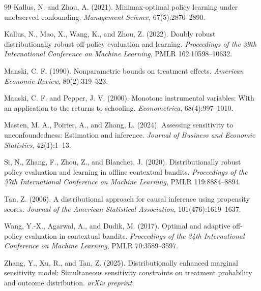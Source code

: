\documentclass[11pt]{article}
\theoremstyle{definition}
\theoremstyle{plain}
\theoremstyle{remark}
\begin{document}
\begin{thebibliography}{99}
Kallus, N. and Zhou, A. (2021).
Minimax-optimal policy learning under unobserved confounding.
\emph{Management Science}, 67(5):2870--2890.

Kallus, N., Mao, X., Wang, K., and Zhou, Z. (2022).
Doubly robust distributionally robust off-policy evaluation and learning.
\emph{Proceedings of the 39th International Conference on Machine Learning}, PMLR 162:10598--10632.

Manski, C. F. (1990).
Nonparametric bounds on treatment effects.
\emph{American Economic Review}, 80(2):319--323.

Manski, C. F. and Pepper, J. V. (2000).
Monotone instrumental variables: With an application to the returns to schooling.
\emph{Econometrica}, 68(4):997--1010.

Masten, M. A., Poirier, A., and Zhang, L. (2024).
Assessing sensitivity to unconfoundedness: Estimation and inference.
\emph{Journal of Business and Economic Statistics}, 42(1):1--13.

Si, N., Zhang, F., Zhou, Z., and Blanchet, J. (2020).
Distributionally robust policy evaluation and learning in offline contextual bandits.
\emph{Proceedings of the 37th International Conference on Machine Learning}, PMLR 119:8884--8894.

Tan, Z. (2006).
A distributional approach for causal inference using propensity scores.
\emph{Journal of the American Statistical Association}, 101(476):1619--1637.

Wang, Y.-X., Agarwal, A., and Dudik, M. (2017).
Optimal and adaptive off-policy evaluation in contextual bandits.
\emph{Proceedings of the 34th International Conference on Machine Learning}, PMLR 70:3589--3597.

Zhang, Y., Xu, R., and Tan, Z. (2025).
Distributionally enhanced marginal sensitivity model: Simultaneous sensitivity constraints on treatment probability and outcome distribution.
\emph{arXiv preprint}.
\end{thebibliography}
\end{document}
